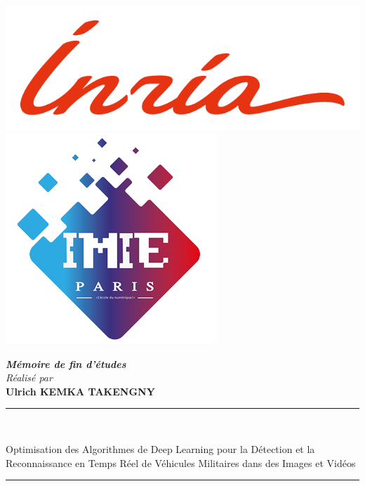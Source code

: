 \documentclass[a4paper, oneside, 12pt, final]{extreport}
\title{\reportSubject}
\author{\reportAuthor}
\newcommand{\reportAuthor} {
  \textbf{Ulrich KEMKA TAKENGNY}
}
\newcommand{\reportSubject} {
Optimisation des Algorithmes de Deep Learning pour la Détection et la Reconnaissance en Temps Réel de Véhicules Militaires dans des Images et Vidéos
}
\begin{document}
\thispagestyle{empty}
\begin{titlepage}

  \begin{center}

    \includegraphics[scale=0.7]{./images/inr_logo_rouge.png}
    \hfill
    \includegraphics[scale=0.4]{./images/logonoir.png}

    \vspace{2.5cm}


    \textbf{\textit{Mémoire de fin d'études}}\\

    \vspace{5pt}
    {\textit{Réalisé par}}\\
    \vspace{10pt} {
      \fontsize{14pt}{14pt}\selectfont
      {\bfseries\Large\sc \reportAuthor}\\
    }

    {
      \renewcommand*{\familydefault}{\defaultFont}
      \fontsize{25pt}{25pt}\selectfont
      \rule{0.5\textwidth}{.4pt}\\
      \vspace{5pt}
      \reportSubject{}\\
      \vspace{5pt}
      \rule{0.5\textwidth}{.4pt}
    }


\end{center}
\end{titlepage}
\end{document}
